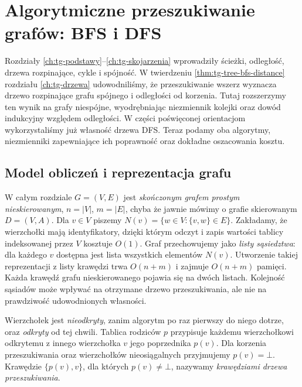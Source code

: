 \chapter{Algorytmiczne przeszukiwanie grafów: BFS i DFS}
\label{ch:tg-bfs-dfs}

Rozdziały \ref{ch:tg-podstawy}--\ref{ch:tg-skojarzenia}
wprowadziły ścieżki, odległość, drzewa rozpinające, cykle i spójność.
W twierdzeniu \ref{thm:tg-tree-bfs-distance} rozdziału
\ref{ch:tg-drzewa} udowodniliśmy, że przeszukiwanie wszerz
wyznacza drzewo rozpinające grafu spójnego i odległości od korzenia.
Tutaj rozszerzymy ten wynik na grafy niespójne, wyodrębniając
niezmiennik kolejki oraz dowód indukcyjny względem odległości.
W części poświęconej orientacjom wykorzystaliśmy już własność
drzewa DFS. Teraz podamy oba algorytmy, niezmienniki zapewniające
ich poprawność oraz dokładne oszacowania kosztu.

\section{Model obliczeń i reprezentacja grafu}
\label{sec:tg-algo-model}

W całym rozdziale $G=(V,E)$ jest \emph{skończonym grafem prostym
nieskierowanym}, $n=|V|$, $m=|E|$, chyba że jawnie mówimy
o grafie skierowanym $D=(V,A)$.
Dla $v\in V$ piszemy $N(v)=\{w\in V:\{v,w\}\in E\}$.
Zakładamy, że wierzchołki mają identyfikatory, dzięki którym
odczyt i zapis wartości tablicy indeksowanej przez $V$
kosztuje $O(1)$.
Graf przechowujemy jako \emph{listy sąsiedztwa}:
dla każdego $v$ dostępna jest lista wszystkich elementów $N(v)$.
Utworzenie takiej reprezentacji z listy krawędzi trwa $O(n+m)$
i zajmuje $O(n+m)$ pamięci.
Każda krawędź grafu nieskierowanego pojawia się na dwóch listach.
Kolejność sąsiadów może wpływać na otrzymane drzewo przeszukiwania,
ale nie na prawdziwość udowodnionych własności.

\begin{definicja}
\label{def:tg-algo-discovery}
Wierzchołek jest \emph{nieodkryty}, zanim algorytm po raz pierwszy
do niego dotrze, oraz \emph{odkryty} od tej chwili.
Tablica rodziców $p$ przypisuje każdemu wierzchołkowi odkrytemu
z innego wierzchołka $v$ jego poprzednika $p(v)$.
Dla korzenia przeszukiwania oraz wierzchołków nieosiągalnych
przyjmujemy $p(v)=\bot$.
Krawędzie $\{p(v),v\}$, dla których $p(v)\neq\bot$,
nazywamy \emph{krawędziami drzewa przeszukiwania}.
\end{definicja}

